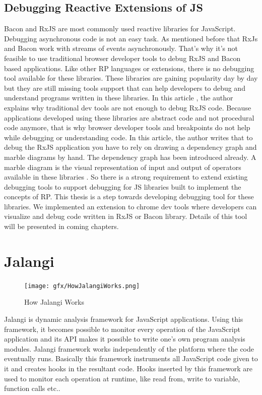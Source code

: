 \subsection{Debugging Reactive Extensions of JS}
Bacon and RxJS are most commonly used reactive libraries for JavaScript. Debugging asynchronous code is not an easy task. As mentioned before that RxJs and Bacon work with streams of events asynchronously. That's why it's not feasible to use traditional browser developer tools to debug RxJS and Bacon based applications.
Like other RP languages or extensions, there is no debugging tool available for these libraries. These libraries are gaining popularity day by day but they are still missing tools support that can help developers to debug and understand programs written in these libraries.
In this article \cite{StaltzAticleHowToDebugRxJS}, the author explains why traditional dev tools are not enough to debug RxJS code. Because applications developed using these libraries are abstract code and not procedural code anymore, that is why browser developer tools and breakpoints do not help while debugging or understanding code. In this article, the author writes that to debug the RxJS application you have to rely on drawing a dependency graph and marble diagrams by hand. The dependency graph has been introduced already. A marble diagram is the visual representation of input and output of operators available in these libraries \cite{StaltzMarbleDiagrams}.
So there is a strong requirement to extend existing debugging tools to support debugging for JS libraries built to implement the concepts of RP.
This thesis is a step towards developing debugging tool for these libraries. We implemented an extension to chrome dev tools where developers can visualize and debug code written in RxJS or Bacon library. Details of this tool will be presented in coming chapters.

\section{Jalangi} \label{sec:Jalangi}
\begin{figure}[!h]
	\centering
	\texttt{[image: gfx/HowJalangiWorks.png]}
	\caption{How Jalangi Works}
	\label{fig:HowJalangiWorks}
\end{figure}

Jalangi is dynamic analysis framework for JavaScript applications. Using this framework, it becomes possible to monitor every operation of the JavaScript application and its API makes it possible to write one's own program analysis modules. Jalangi framework works independently of the platform where the code eventually runs. Basically this framework instruments all JavaScript code given to it and creates hooks in the resultant code. Hooks inserted by this framework are used to monitor each operation at runtime, like read from, write to variable, function calls etc.. \cite{Sen:2013:JSR:2491411.2491447}

